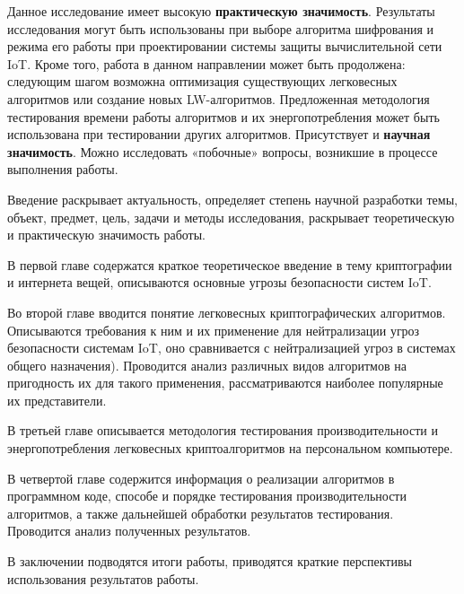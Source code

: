 Данное исследование имеет высокую \textbf{практическую значимость}.  Результаты исследования могут быть использованы при выборе алгоритма шифрования и режима его работы при проектировании системы защиты вычислительной сети IoT. Кроме того, работа в данном направлении может быть продолжена: следующим шагом возможна оптимизация существующих легковесных алгоритмов или создание новых LW-алгоритмов. Предложенная методология тестирования времени работы алгоритмов и их энергопотребления может быть использована при тестировании других алгоритмов. Присутствует и \textbf{научная значимость}. Можно исследовать «побочные» вопросы, возникшие в процессе выполнения работы.

Введение раскрывает актуальность, определяет степень научной разработки темы, объект, предмет, цель, задачи и методы исследования, раскрывает теоретическую и практическую значимость работы.

В первой главе содержатся краткое теоретическое введение в тему криптографии и интернета вещей, описываются основные угрозы безопасности систем IoT.

Во второй главе вводится понятие легковесных криптографических алгоритмов. Описываются требования к ним и их применение для нейтрализации угроз безопасности системам IoT, оно сравнивается с нейтрализацией угроз в системах общего назначения). Проводится анализ различных видов алгоритмов на пригодность их для такого применения, рассматриваются наиболее популярные их представители.

В третьей главе описывается методология тестирования производительности и энергопотребления легковесных криптоалгоритмов на персональном компьютере. 

В четвертой главе содержится информация о реализации алгоритмов в программном коде, способе и порядке тестирования производительности алгоритмов, а также дальнейшей обработки результатов тестирования. Проводится анализ полученных результатов.

В заключении подводятся итоги работы, приводятся краткие перспективы использования результатов работы. 

